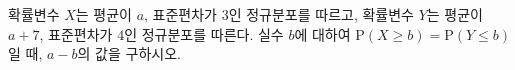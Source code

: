 확률변수 $X$는 평균이 $a$, 표준편차가 $3$인 정규분포를 따르고, 확률변수 $Y$는 평균이 $a+7$, 표준편차가 $4$인 정규분포를 따른다. 실수 $b$에 대하여 $\mathrm{P}(X\ge b)=\mathrm{P}(Y\le b)$일 때, $a-b$의 값을 구하시오.
